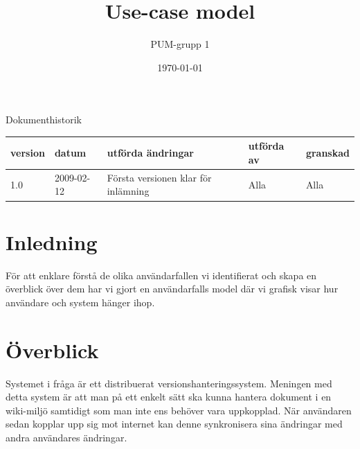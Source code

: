 

\ifpdf
\else
\fi

\title{Use-case model}
\author{PUM-grupp 1}
\date{\today}



\maketitle\thispagestyle{empty}
\newpage

{\centering \Large{Dokumenthistorik\\}}

\vspace{10pt}
\begin{tabularx}{\textwidth}{ |l|l|X|l|l| }
  \hline
    \textbf{version} & \textbf{datum} & \textbf{utförda ändringar} & \textbf{utförda av} & \textbf{granskad} \\
	\hline 
  1.0 & 2009-02-12 &  Första versionen klar för inlämning  & Alla & Alla   \\
  \hline
\end{tabularx}

\newpage
\setcounter{tocdepth}{2}
\tableofcontents
\newpage

\section{Inledning}
För att enklare förstå de olika användarfallen vi identifierat och skapa en överblick över dem har vi gjort en användarfalls model där vi grafisk visar hur användare och system hänger ihop.
\section{Överblick}
Systemet i fråga är ett distribuerat versionshanteringssystem. Meningen med detta system är att man på ett enkelt sätt ska kunna hantera dokument i en wiki-miljö samtidigt som man inte ens behöver vara uppkopplad. När användaren sedan kopplar upp sig mot internet kan denne synkronisera sina ändringar med andra användares ändringar.
